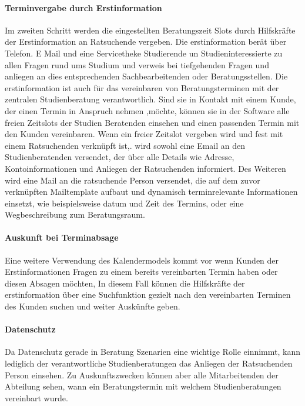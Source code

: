 \documentclass[12pt]{article}
\begin{document}
\paragraph{Terminvergabe durch Erstinformation}
Im zweiten Schritt werden die eingestellten Beratungszeit Slots durch
Hilfskräfte der Erstinformation an Ratsuchende vergeben. Die erstinformation
berät über Telefon. E Mail und eine Servicetheke Studierende un
Studieninteressierte zu allen Fragen rund ums Studium und verweis bei
tiefgehenden Fragen und anliegen an dies entsprechenden Sachbearbeitenden
oder Beratungsstellen. Die erstinformation ist auch für das vereinbaren von
Beratungsterminen mit der zentralen Studienberatung verantwortlich. Sind sie
in Kontakt mit einem Kunde, der einen Termin in Anspruch nehmen ,möchte, können
sie in der Software alle freien Zeitslots der Studien Beratenden einsehen und
einen passenden Termin mit den Kunden vereinbaren. Wenn ein freier Zeitslot
vergeben wird und fest mit einem Ratsuchenden verknüpft ist,. wird sowohl eine
Email an den Studienberatenden versendet, der über alle Details wie Adresse,
Kontoinformationen und Anliegen der Ratsuchenden informiert. Des Weiteren wird
eine Mail an die ratsuchende Person versendet, die auf dem zuvor verknüpften
Mailtemplate aufbaut und dynamisch terminrelevante Informationen einsetzt, wie
beispielsweise datum und Zeit des Termins, oder eine Wegbeschreibung zum
Beratungsraum.

\paragraph{Auskunft bei Terminabsage}
Eine weitere Verwendung des Kalendermodels kommt vor wenn Kunden der
Erstinformationen Fragen zu einem bereits vereinbarten Termin haben oder diesen
Absagen möchten, In diesem Fall können die Hilfskräfte der erstinformation über
eine Suchfunktion gezielt nach den vereinbarten Terminen des Kunden suchen und
weiter Auskünfte geben.

\paragraph{Datenschutz}
Da Datenschutz gerade in Beratung Szenarien eine wichtige Rolle einnimmt, kann
lediglich der verantwortliche Studienberatungen das Anliegen der Ratsuchenden
Person einsehen. Zu Auskunftszwecken können aber alle Mitarbeitenden der
Abteilung sehen, wann ein Beratungstermin mit welchem Studienberatungen
vereinbart wurde.
\end{document}
